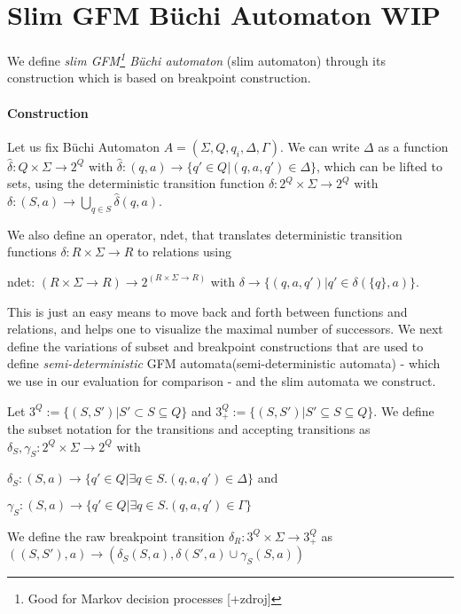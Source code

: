 \documentclass[
	digital
nolof, nolot
]{fithesis3}
\begin{document}
		\section{Slim GFM Büchi Automaton WIP}
			We define \emph{slim GFM\footnote{Good for Markov decision processes [+zdroj]} Büchi automaton} (slim automaton) through its construction which is based on breakpoint construction. 
			\paragraph{Construction}
			Let us fix Büchi Automaton $A=(\Sigma, Q, q_i, \Delta, \Gamma)$. We can write $\Delta$ as a function $\hat{\delta}: Q \times \Sigma \rightarrow 2^Q$ with
			$\hat{\delta}: (q, a) \rightarrow \{q' \in Q | (q, a, q') \in \Delta\}$,
			which can be lifted to sets, using the deterministic transition function $\delta: 2^Q \times \Sigma \rightarrow 2^Q$ with
			$\delta: (S, a) \rightarrow
			\bigcup_{q\in S} \hat{\delta}(q,a)$.
			
			We also define an operator, ndet, that translates deterministic transition functions
			$\delta: R \times \Sigma \rightarrow R$ to relations using
			
			ndet: $(R \times \Sigma \rightarrow R) \rightarrow 2^{(R \times \Sigma \rightarrow R)}$
			with
			$\delta \rightarrow \{(q,a,q')|q' \in \delta(\{q\},a)\}$.
			
			This is just an easy means to move back and forth between functions and relations,
			and helps one to visualize the maximal number of successors. We next define the variations of subset and breakpoint constructions that are used to define  \emph{semi-deterministic} GFM automata(semi-deterministic automata) - which we use in our evaluation for comparison - and the slim automata we construct.
			
			Let $3^Q :=\{(S,S')|S'\subset S \subseteq Q\}$ and
			$3^Q_+:=\{(S,S')|S'\subseteq S \subseteq Q\}$.
			We define the subset notation for the transitions and accepting transitions as $\delta_S,\gamma_S:2^Q \times \Sigma \rightarrow 2^Q$ with
			
			$\delta_S: (S,a)\rightarrow\{q'\in Q | \exists q \in S.(q,a,q') \in \Delta\}$ and
			
			$\gamma_S: (S,a)\rightarrow\{q'\in Q | \exists q \in S.(q,a,q') \in \Gamma\}$
			
			We define the raw breakpoint transition
			$\delta_R:3^Q \times \Sigma \rightarrow 3^Q_+$ as
			$((S, S'), a) \rightarrow(\delta_S(S, a), \delta(S',a)\cup \gamma_S(S, a))$
		
\end{document}
